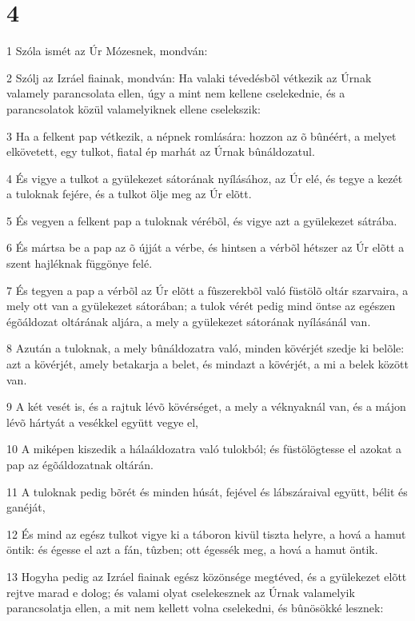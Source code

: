 \chapter{4}

\par 1 Szóla ismét az Úr Mózesnek, mondván:
\par 2 Szólj az Izráel fiainak, mondván: Ha valaki tévedésbõl vétkezik az Úrnak valamely parancsolata ellen, úgy a mint nem kellene cselekednie, és a parancsolatok közül valamelyiknek ellene cselekszik:
\par 3 Ha a felkent pap vétkezik, a népnek romlására: hozzon az õ bûnéért, a melyet elkövetett, egy tulkot, fiatal ép marhát az Úrnak bûnáldozatul.
\par 4 És vigye a tulkot a gyülekezet sátorának nyílásához, az Úr elé, és tegye a kezét a tuloknak fejére, és a tulkot ölje meg az Úr elõtt.
\par 5 És vegyen a felkent pap a tuloknak vérébõl, és vigye azt a gyülekezet sátrába.
\par 6 És mártsa be a pap az õ újját a vérbe, és hintsen a vérbõl hétszer az Úr elõtt a szent hajléknak függönye felé.
\par 7 És tegyen a pap a vérbõl az Úr elõtt a fûszerekbõl való füstölõ oltár szarvaira, a mely ott van a gyülekezet sátorában; a tulok vérét pedig mind öntse az egészen égõáldozat oltárának aljára, a mely a gyülekezet sátorának nyílásánál van.
\par 8 Azután a tuloknak, a mely bûnáldozatra való, minden kövérjét szedje ki belõle: azt a kövérjét, amely betakarja a belet, és mindazt a kövérjét, a mi a belek között van.
\par 9 A két vesét is, és a rajtuk lévõ kövérséget, a mely a véknyaknál van, és a májon lévõ hártyát a vesékkel együtt vegye el,
\par 10 A miképen kiszedik a hálaáldozatra való tulokból; és füstölögtesse el azokat a pap az égõáldozatnak oltárán.
\par 11 A tuloknak pedig bõrét és minden húsát, fejével és lábszáraival együtt, bélit és ganéját,
\par 12 És mind az egész tulkot vigye ki a táboron kivül tiszta helyre, a hová a hamut öntik: és égesse el azt a fán, tûzben; ott égessék meg, a hová a hamut öntik.
\par 13 Hogyha pedig az Izráel fiainak egész közönsége megtéved, és a gyülekezet elõtt rejtve marad e dolog; és valami olyat cselekesznek az Úrnak valamelyik parancsolatja ellen, a mit nem kellett volna cselekedni, és bûnösökké lesznek:
